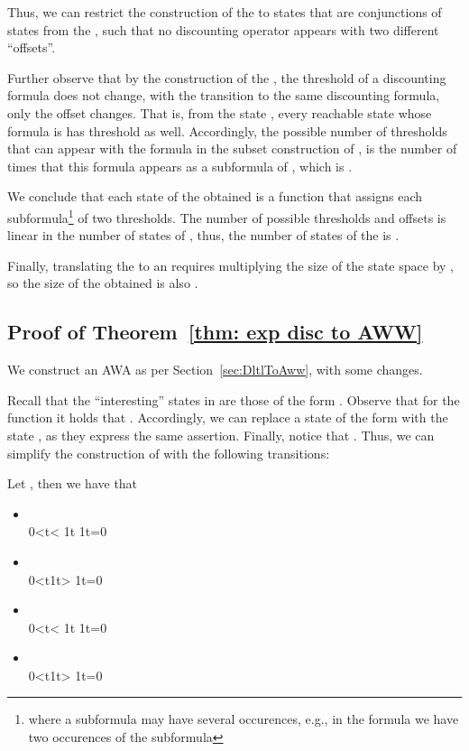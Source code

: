 \documentclass{llncs}
\newcommand{\AWW}{\mbox{\rm AWA}\xspace}
\begin{document}
Thus, we can restrict the construction of the  to states that are conjunctions of states from the , such that no discounting operator appears with two different ``offsets''.

Further observe that by the construction of the , the threshold of a discounting formula does not change, with the transition to the same discounting formula, only the offset changes. That is, from the state , every reachable state whose formula is  has threshold  as well. Accordingly, the possible number of thresholds that can appear with the formula  in the subset construction of , is the number of times that this formula appears as a subformula of , which is .

We conclude that each state of the obtained  is a function that assigns each subformula\footnote{where a subformula may have several occurences, e.g., in the formula  we have two occurences of the subformula } of  two thresholds.
The number of possible thresholds and offsets is linear in the number of states of , thus, the number of states of the  is .

Finally, translating the  to an  requires multiplying the size of the state space by , so the size of the obtained  is also .


\subsection{Proof of Theorem~\ref{thm: exp disc to AWW}}
We construct an \AWW  as per Section~\ref{sec:DltlToAww}, with some changes.

Recall that the ``interesting'' states in  are those of the form .
Observe that for the function  it holds that . Accordingly, we can replace a state of the form  with the state , as they express the same assertion.
Finally, notice that . Thus, we can simplify the construction of  with the following transitions:

Let , then we have that
\begin{itemize}
\item
\\0<t< 1t \geq 1t=0


\item
\\0<t\le 1t> 1t=0

\item
\\0<t< 1t \geq 1t=0

\item
\\0<t\le 1t> 1t=0
\end{itemize}
\end{document}
